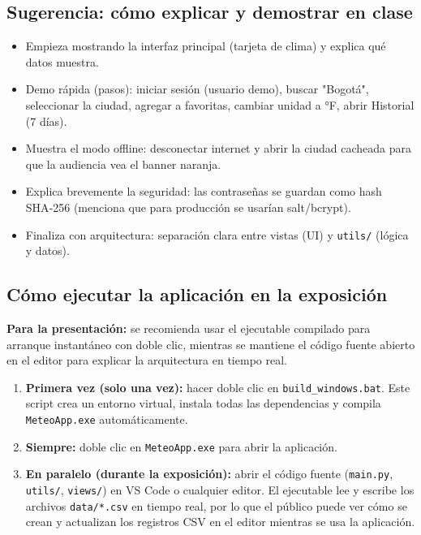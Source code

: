 \documentclass[12pt,a4paper]{article}
\begin{document}

\subsection{Sugerencia: cómo explicar y demostrar en clase}
\begin{itemize}
    \item Empieza mostrando la interfaz principal (tarjeta de clima) y explica qué datos muestra.
    \item Demo rápida (pasos): iniciar sesión (usuario demo), buscar "Bogot\'a", seleccionar la ciudad, agregar a favoritas, cambiar unidad a °F, abrir Historial (7 días).
    \item Muestra el modo offline: desconectar internet y abrir la ciudad cacheada para que la audiencia vea el banner naranja.
    \item Explica brevemente la seguridad: las contrase\~nas se guardan como hash SHA‑256 (menciona que para producción se usar\'ian salt/bcrypt).
    \item Finaliza con arquitectura: separaci\'on clara entre vistas (UI) y \texttt{utils/} (l\'ogica y datos).
\end{itemize}

\subsection{Cómo ejecutar la aplicación en la exposición}

\noindent\textbf{Para la presentación:} se recomienda usar el ejecutable compilado para arranque instantáneo con doble clic, mientras se mantiene el código fuente abierto en el editor para explicar la arquitectura en tiempo real.

\begin{enumerate}[itemsep=4pt]
    \item \textbf{Primera vez (solo una vez):} hacer doble clic en \texttt{build\_windows.bat}. Este script crea un entorno virtual, instala todas las dependencias y compila \texttt{MeteoApp.exe} automáticamente.
    \item \textbf{Siempre:} doble clic en \texttt{MeteoApp.exe} para abrir la aplicación.
    \item \textbf{En paralelo (durante la exposición):} abrir el código fuente (\texttt{main.py}, \texttt{utils/}, \texttt{views/}) en VS Code o cualquier editor. El ejecutable lee y escribe los archivos \texttt{data/*.csv} en tiempo real, por lo que el público puede ver cómo se crean y actualizan los registros CSV en el editor mientras se usa la aplicación.
\end{enumerate}
\end{document}
